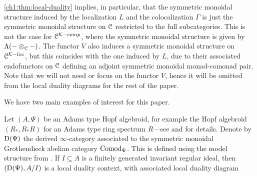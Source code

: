 \begin{remark}
    \label{ch1:rm:monoidal-structure-in-local-duality}
    \cref{ch1:thm:local-duality} implies, in particular, that the symmetric monoidal structure induced by the localization $L$ and the colocalization $\Gamma$ is just the symmetric monoidal structure on $\EuScript{C}$ restricted to the full subcategories. This is not the case for $\EuScript{C}^{\mathcal{K}-comp}$, where the symmetric monoidal structure is given by $\Lambda(-\otimes_{\EuScript{C}}-)$. The functor $V$ also induces a symmetric monoidal structure on $\EuScript{C}^{\mathcal{K}-loc}$, but this coincides with the one induced by $L$, due to their associated endofunctors on $\EuScript{C}$ defining an adjoint symmetric monoidal monad-comonad pair. Note that we will not need or focus on the functor $V$, hence it will be omitted from the local duality diagrams for the rest of the paper. 
\end{remark}

We have two main examples of interest for this paper. 

\begin{example}
    \label{ch1:ex:local-duality-comod}
    Let $(A,\Psi)$ be an Adams type Hopf algebroid, for example the Hopf algebroid $(R_*, R_*R)$ for an Adams type ring spectrum $R$---see \cite[A.1]{ravenel_86} and \cite{hovey_04} for details. Denote by $\mathrm{D}(\Psi)$ the derived $\infty$-category associated to the symmetric monoidal Grothendieck abelian category $\mathrm{Comod}_\Psi$. This is defined using the model structure from \cite{barnes-roitzheim_2011}. If $I\subseteq A$ is a finitely generated invariant regular ideal, then $(\mathrm{D}(\Psi), A/I)$ is a local duality context, with associated local duality diagram
    \begin{center}
    \end{center}
\end{example}

